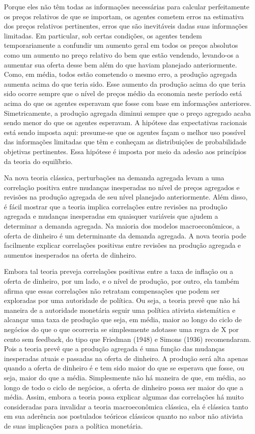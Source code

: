 \documentclass[a4paper,12pt]{article}[abntex2]
\begin{document}
Porque eles não têm todas as informações necessárias para calcular perfeitamente os preços relativos de que se importam, os agentes cometem erros na estimativa dos preços relativos pertinentes, erros que são inevitáveis dadas suas informações limitadas. Em particular, sob certas condições, os agentes tendem temporariamente a confundir um aumento geral em todos os preços absolutos como um aumento no preço relativo do bem que estão vendendo, levando-os a aumentar sua oferta desse bem além do que haviam planejado anteriormente. Como, em média, todos estão cometendo o mesmo erro, a produção agregada aumenta acima do que teria sido. Esse aumento da produção acima do que teria sido ocorre sempre que o nível de preços médio da economia neste período está acima do que os agentes esperavam que fosse com base em informações anteriores. Simetricamente, a produção agregada diminui sempre que o preço agregado acaba sendo menor do que os agentes esperavam. A hipótese das expectativas racionais está sendo imposta aqui: presume-se que os agentes façam o melhor uso possível das informações limitadas que têm e conheçam as distribuições de probabilidade objetivas pertinentes. Essa hipótese é imposta por meio da adesão aos princípios da teoria do equilíbrio.

Na nova teoria clássica, perturbações na demanda agregada levam a uma correlação positiva entre mudanças inesperadas no nível de preços agregados e revisões na produção agregada de seu nível planejado anteriormente. Além disso, é fácil mostrar que a teoria implica correlações entre revisões na produção agregada e mudanças inesperadas em quaisquer variáveis que ajudem a determinar a demanda agregada. Na maioria dos modelos macroeconômicos, a oferta de dinheiro é um determinante da demanda agregada. A nova teoria pode facilmente explicar correlações positivas entre revisões na produção agregada e aumentos inesperados na oferta de dinheiro.

Embora tal teoria preveja correlações positivas entre a taxa de inflação ou a oferta de dinheiro, por um lado, e o nível de produção, por outro, ela também afirma que essas correlações não retratam compensações que podem ser exploradas por uma autoridade de política. Ou seja, a teoria prevê que não há maneira de a autoridade monetária seguir uma política ativista sistemática e alcançar uma taxa de produção que seja, em média, maior ao longo do ciclo de negócios do que o que ocorreria se simplesmente adotasse uma regra de X por cento sem feedback, do tipo que Friedman (1948) e Simons (1936) recomendaram. Pois a teoria prevê que a produção agregada é uma função das mudanças inesperadas atuais e passadas na oferta de dinheiro. A produção será alta apenas quando a oferta de dinheiro é e tem sido maior do que se esperava que fosse, ou seja, maior do que a média. Simplesmente não há maneira de que, em média, ao longo de todo o ciclo de negócios, a oferta de dinheiro possa ser maior do que a média. Assim, embora a teoria possa explicar algumas das correlações há muito consideradas para invalidar a teoria macroeconômica clássica, ela é clássica tanto em sua aderência aos postulados teóricos clássicos quanto no sabor não ativista de suas implicações para a política monetária.
\end{document}
